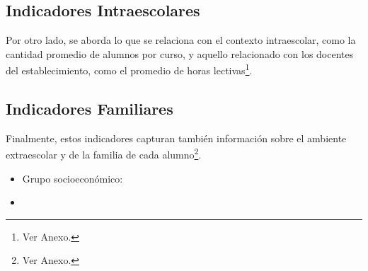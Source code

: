 \subsection{Indicadores Intraescolares}

Por otro lado, se aborda lo que se relaciona con el contexto intraescolar, como la cantidad promedio de alumnos por curso, y aquello relacionado con los docentes del establecimiento, como el promedio de horas lectivas\footnote{Ver Anexo.}.

\subsection{Indicadores Familiares}

Finalmente, estos indicadores capturan también información sobre el ambiente extraescolar y de la familia de cada alumno\footnote{Ver Anexo.}. 

\begin{itemize}
\item Grupo socioeconómico:
\item 
\end{itemize}